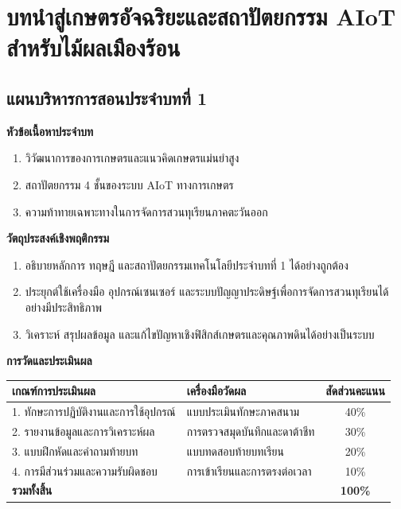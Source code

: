 \chapter{บทนำสู่เกษตรอัจฉริยะและสถาปัตยกรรม AIoT สำหรับไม้ผลเมืองร้อน}
\label{chap:ch01}

\section*{แผนบริหารการสอนประจำบทที่ 1}

\noindent\textbf{หัวข้อเนื้อหาประจำบท}
\begin{enumerate}
    \item วิวัฒนาการของการเกษตรและแนวคิดเกษตรแม่นยำสูง
    \item สถาปัตยกรรม 4 ชั้นของระบบ AIoT ทางการเกษตร
    \item ความท้าทายเฉพาะทางในการจัดการสวนทุเรียนภาคตะวันออก
\end{enumerate}

\noindent\textbf{วัตถุประสงค์เชิงพฤติกรรม}
\begin{enumerate}
    \item อธิบายหลักการ ทฤษฎี และสถาปัตยกรรมเทคโนโลยีประจำบทที่ 1 ได้อย่างถูกต้อง
    \item ประยุกต์ใช้เครื่องมือ อุปกรณ์เซนเซอร์ และระบบปัญญาประดิษฐ์เพื่อการจัดการสวนทุเรียนได้อย่างมีประสิทธิภาพ
    \item วิเคราะห์ สรุปผลข้อมูล และแก้ไขปัญหาเชิงฟิสิกส์เกษตรและคุณภาพดินได้อย่างเป็นระบบ
\end{enumerate}

\noindent\textbf{การวัดและประเมินผล}
\begin{table}[H]
\centering\small
\begin{tabularx}{\textwidth}{p{} p{} c}
\toprule
\textbf{เกณฑ์การประเมินผล} & \textbf{เครื่องมือวัดผล} & \textbf{สัดส่วนคะแนน} \\
\midrule
1. ทักษะการปฏิบัติงานและการใช้อุปกรณ์ & แบบประเมินทักษะภาคสนาม & 40\% \\
2. รายงานข้อมูลและการวิเคราะห์ผล & การตรวจสมุดบันทึกและดาต้าชีท & 30\% \\
3. แบบฝึกหัดและคำถามท้ายบท & แบบทดสอบท้ายบทเรียน & 20\% \\
4. การมีส่วนร่วมและความรับผิดชอบ & การเข้าเรียนและการตรงต่อเวลา & 10\% \\
\midrule
\textbf{รวมทั้งสิ้น} & & \textbf{100\%} \\
\bottomrule
\end{tabularx}
\end{table}
\newpage

